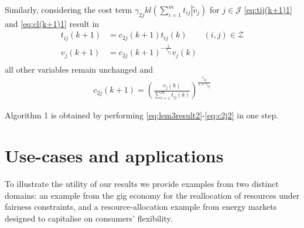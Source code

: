\documentclass[twocolumn]{article}
\begin{document}



%
%
Similarly, considering 
the cost term
$\gamma_{2j} kl\left(\left. \sum_{i=1}^m  t_{ij} \right| \tilde{v}_j\right)$ for $j \in \mathcal{J}$
\eqref{eq:tij(k+1)1} and \eqref{eq:cl(k+1)1}
result in
\begin{equation}
\label{eq:lem6result}
\begin{aligned}
t_{ij}(k+1) &= c_{2j}(k+1)  t_{ij}(k) \qquad (i,j) \in {\mathcal Z}\\
v_j(k+1) &= c_{2j}(k+1)^{-\frac{1}{\gamma_{2j}} }v_j(k)	\\
\end{aligned}
\end{equation}
all other variables remain unchanged and
\begin{align}
\label{eq:c2j2}
c_{2j}(k+1)= \left(\frac{v_j(k)}{\sum_{i=1}^m t_{ij}(k)}\right)^\frac{\gamma_{2j}}{1+\gamma_{2j} }
\end{align}

Algorithm 1 is obtained by performing \eqref{eq:lem3result2}-\eqref{eq:c2j2} in one step.

\section{Use-cases and applications}\label{sec:applications}
To illustrate the utility of our results we provide examples from two distinct domains: an example from the gig economy for the reallocation of resources under fairness constraints, and a resource-allocation example from energy markets designed to capitalise on consumers' flexibility.
\end{document}
